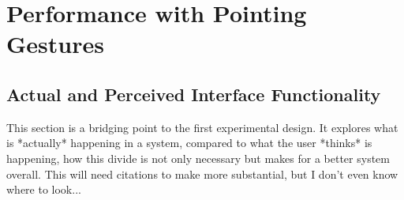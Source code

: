 \chapter{Performance with Pointing Gestures}
\label{cha:pointing}

\section{Actual and Perceived Interface Functionality}

\begin{commentenv}
This section is a bridging point to the first experimental design. It explores what is *actually* happening in a system, compared to what the user *thinks* is happening, how this divide is not only necessary but makes for a better system overall. This will need citations to make more substantial, but I don't even know where to look...
\end{commentenv}

